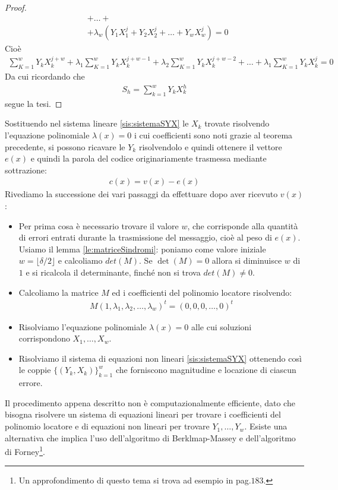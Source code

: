 \begin{proof}
\begin{align*}
      &+ \dots + \\
      &+\lambda_{w}(Y_{1}X_{1}^{j} + Y_{2}X_{2}^{j} + \dots + Y_{w}X_{w}^{j}) = 0
   \end{align*}
   Cioè
   \begin{align*}
      \sum_{K=1}^{w} Y_{k}X_{k}^{j+w} + \lambda_{1}\sum_{K=1}^{w} Y_{k}X_{k}^{j+w-1} + \lambda_{2}\sum_{K=1}^{w} Y_{k}X_{k}^{j+w-2} + \dots + \lambda_{1}\sum_{K=1}^{w} Y_{k}X_{k}^{j} = 0
   \end{align*}
   Da cui ricordando che
   \begin{align*}
      S_{h} = \sum_{k=1}^{w} Y_{k}X_{k}^{h}
   \end{align*}
   segue la tesi.
\end{proof}

Sostituendo nel sistema lineare \ref{sis:sistemaSYX} le $X_{k}$ trovate risolvendo l'equazione polinomiale $\lambda(x)=0$ i cui coefficienti sono noti grazie al teorema precedente, si possono ricavare le $Y_{k}$ risolvendolo e quindi ottenere il vettore $e(x)$ e quindi la parola del codice originariamente trasmessa mediante sottrazione:
\begin{align*}
   c(x) = v(x) - e(x)
\end{align*}
Rivediamo la successione dei vari passaggi da effettuare dopo aver ricevuto $v(x)$:
\begin{itemize}
   \item Per prima cosa è necessario trovare il valore $w$, che corrisponde alla quantità di errori entrati durante la trasmissione del messaggio, cioè al peso di $e(x)$. Usiamo il lemma \ref{le:matriceSindromi}: poniamo come valore iniziale $w=\lfloor \delta/2 \rfloor$ e calcoliamo $det(M)$. Se $\det(M) = 0$ allora si diminuisce $w$ di $1$ e si ricalcola il determinante, finché non si trova $det(M) \neq 0$. 
   \item Calcoliamo la matrice $M$ ed i coefficienti del polinomio locatore risolvendo:
   \begin{align*}
      M (1,\lambda_1, \lambda_{2}, \dots, \lambda_{w})^{t} = (0,0,0, \dots , 0)^{t}
   \end{align*}
   \item Risolviamo l'equazione polinomiale $\lambda(x) = 0$ alle cui soluzioni corrispondono $X_{1}, \dots , X_{w}$.
   \item Risolviamo il sistema di equazioni non lineari \ref{sis:sistemaSYX} ottenendo così le coppie $\lbrace (Y_{k},X_{k})\rbrace_{k=1}^{w}$ che forniscono magnitudine e locazione di ciascun errore.
\end{itemize}
Il procedimento appena descritto non è computazionalmente efficiente, dato che bisogna risolvere un sistema di equazioni lineari per trovare i coefficienti del polinomio locatore e di equazioni non lineari per trovare $Y_{1}, \dots , Y_{w}$. Esiste una alternativa che implica l'uso dell'algoritmo di Berklmap-Massey e dell'algoritmo di Forney\footnote{Un approfondimento di questo tema si trova ad esempio in \cite{blahut} pag.$183$.}.

